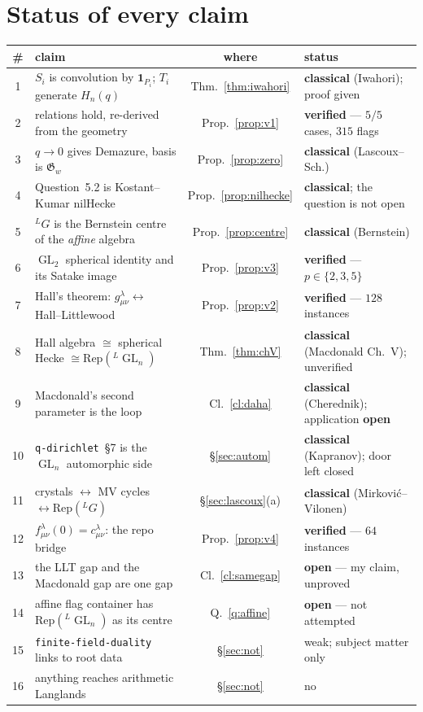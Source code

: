 \documentclass[11pt,a4paper]{article}
\theoremstyle{definition}
\theoremstyle{remark}
\newcommand{\Rep}{\mathrm{Rep}}
\newcommand{\dual}[1]{{}^{L}\!#1}
\DeclareMathOperator{\GL}{GL}
\newcommand{\Groth}{\mathfrak{G}}
\newcommand{\OK}{\textcolor{okgreen}{\textbf{verified}}}
\newcommand{\CL}{\textbf{classical}}
\newcommand{\NEW}{\textcolor{openblue}{\textbf{open}}}
\begin{document}
\section{Status of every claim}\label{sec:status}

\begin{center}
\footnotesize
\setlength{\tabcolsep}{2.5pt}
\begin{tabular}{clcl}
\toprule
\# & claim & where & status \\
\midrule
1 & $S_i$ is convolution by $\mathbf{1}_{P_i}$; $T_i$ generate $H_n(q)$
  & Thm.~\ref{thm:iwahori} & \CL{} (Iwahori); proof given \\
2 & relations hold, re-derived from the geometry
  & Prop.~\ref{prop:v1} & \OK{} --- $5/5$ cases, $315$ flags \\
3 & $q\to0$ gives Demazure, basis is $\Groth_w$
  & Prop.~\ref{prop:zero} & \CL{} (Lascoux--Sch.) \\
4 & Question~5.2 is Kostant--Kumar nilHecke
  & Prop.~\ref{prop:nilhecke} & \CL{}; the question is not open \\
5 & $\dual{G}$ is the Bernstein centre of the \emph{affine} algebra
  & Prop.~\ref{prop:centre} & \CL{} (Bernstein) \\
6 & $\GL_2$ spherical identity and its Satake image
  & Prop.~\ref{prop:v3} & \OK{} --- $p \in \{2,3,5\}$ \\
7 & Hall's theorem: $g^\lambda_{\mu\nu} \leftrightarrow$ Hall--Littlewood
  & Prop.~\ref{prop:v2} & \OK{} --- $128$ instances \\
8 & Hall algebra $\cong$ spherical Hecke $\cong \Rep(\dual{\GL_n})$
  & Thm.~\ref{thm:chV} & \CL{} (Macdonald Ch.~V); unverified \\
9 & Macdonald's second parameter is the loop
  & Cl.~\ref{cl:daha} & \CL{} (Cherednik); application \NEW{} \\
10 & \texttt{q-dirichlet}~\S7 is the $\GL_n$ automorphic side
  & \S\ref{sec:autom} & \CL{} (Kapranov); door left closed \\
11 & crystals $\leftrightarrow$ MV cycles $\leftrightarrow \Rep(\dual{G})$
  & \S\ref{sec:lascoux}(a) & \CL{} (Mirkovi\'c--Vilonen) \\
12 & $f^\lambda_{\mu\nu}(0) = c^\lambda_{\mu\nu}$: the repo bridge
  & Prop.~\ref{prop:v4} & \OK{} --- $64$ instances \\
13 & the LLT gap and the Macdonald gap are one gap
  & Cl.~\ref{cl:samegap} & \NEW{} --- my claim, unproved \\
14 & affine flag container has $\Rep(\dual{\GL_n})$ as its centre
  & Q.~\ref{q:affine} & \NEW{} --- not attempted \\
15 & \texttt{finite-field-duality} links to root data
  & \S\ref{sec:not} & weak; subject matter only \\
16 & anything reaches arithmetic Langlands
  & \S\ref{sec:not} & no \\
\bottomrule
\end{tabular}
\end{center}
\end{document}
